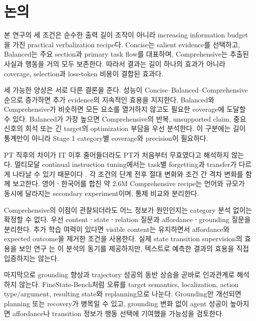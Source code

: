 \section{논의}

본 연구의 세 조건은 순수한 출력 길이 조작이 아니라 increasing
information budget을 가진 practical verbalization recipe다.
Concise는 salient evidence를 선택하고, Balanced는 주요 section과
primary task flow를 대표하며, Comprehensive는 추출된 사실과
행동을 거의 모두 보존한다. 따라서 결과는 길이 하나의 효과가
아니라 coverage, selection과 loss-token 비용이 결합된 효과다.

세 가능한 양상은 서로 다른 결론을 준다. 성능이
Concise--Balanced--Comprehensive 순으로 증가하면 추가 evidence의
지속적인 효용을 지지한다. Balanced와 Comprehensive가 비슷하면
모든 요소를 열거하지 않고도 필요한 coverage에 도달할 수 있다.
Balanced가 가장 높으면 Comprehensive의 반복, unsupported claim,
중요 신호의 희석 또는 긴 target의 optimization 부담을 우선
분석한다. 이 구분에는 길이 통계만이 아니라 Stage 1 category별
coverage와 precision이 필요하다.

PT 직후의 차이가 IT 이후 줄어들더라도 PT가 처음부터 무효였다고
해석하지 않는다. 멀티모달 continual instruction tuning에서는
task별 forgetting과 transfer가 다르게 나타날 수 있기 때문이다
\citep{he2026continual}. 각 조건의 단계 전후 절대 변화와 조건 간
격차 변화를 함께 보고한다. 영어ㆍ한국어를 합친 약 2.6M
Comprehensive recipe는 언어와 규모가 동시에 달라지는 secondary
experiment이며, 통제 비교와 분리한다.

Comprehensive의 이점이 관찰되더라도 어느 정보가 원인인지는
category 분석 없이는 확정할 수 없다. 우선 contentㆍstateㆍrelation
질문과 affordanceㆍgrounding 질문을 분리한다. 추가 학습 여력이
있다면 visible content는 유지하면서 affordance와 expected outcome을
제거한 조건을 사용한다. 실제 state transition supervision의
효용을 보인 연구 \citep{liu2026statetransition}는 이 분석의
동기를 제공하지만, 텍스트로 예측한 결과의 효용을 직접 입증하지는
않는다.

마지막으로 grounding 향상과 trajectory 성공의 동반 상승을 곧바로
인과관계로 해석하지 않는다. FineState-Bench처럼
\citep{ji2026finestate} 오류를 target semantics, localization,
action type/argument, resulting state와 replanning으로 나눈다.
Grounding만 개선되면 planning 또는 recovery가 병목일 수 있고,
grounding 변화 없이 agent 성공이 높아지면 affordance나 transition
정보가 행동 선택에 기여했을 가능성을 검토한다.

